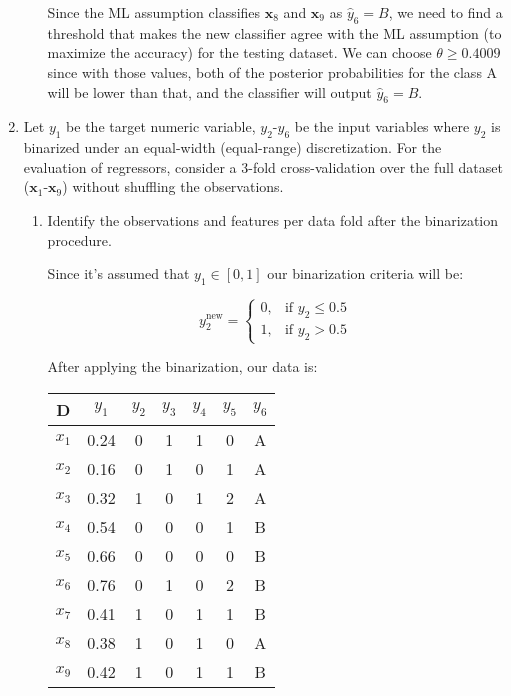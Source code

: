 \documentclass[12pt]{article}
\begin{document}
\begin{enumerate}[leftmargin=\labelsep]
\begin{enumerate}
            Since the ML assumption classifies $\mathbf{x}_8$ and $\mathbf{x}_9$ as $\hat{y}_6 = B$, we need to find a threshold that makes the new classifier agree with the ML assumption (to maximize the accuracy) for the testing dataset.
            We can choose $\theta \geq 0.4009$ since with those values, both of the posterior probabilities for the class A will be lower than that, and the classifier will output $\hat{y}_6 = B$.

    \end{enumerate}

    \item Let $y_1$ be the target numeric variable, $y_2$-$y_6$ be the input variables where $y_2$ is binarized under an
    equal-width (equal-range) discretization. For the evaluation of regressors, consider a 3-fold
    cross-validation over the full dataset ($\mathbf{x}_1$-$\mathbf{x}_9$) without shuffling the observations.

    \begin{enumerate}
        \item Identify the observations and features per data fold after the binarization procedure.
        
        Since it's assumed that $y_1 \in [0, 1]$ our binarization criteria will be:

        \[ 
            y_2^{\textrm{new}} = \left\{
            \begin{array}{ll}
                  0, & \textrm{if } y_2 \leq 0.5 \\
                  1, & \textrm{if } y_2 > 0.5
            \end{array} 
            \right. 
        \]

        After applying the binarization, our data is:

        \begin{center}
        \begin{tabular}{|c|c|c|c|c|c|c|}
        \hline
        D     & $y_1$ & $y_2$ & $y_3$ & $y_4$ & $y_5$ & $y_6$ \\
        \hline
        $x_1$ & 0.24  & 0     & 1     & 1     & 0     & A \\
        $x_2$ & 0.16  & 0     & 1     & 0     & 1     & A \\
        $x_3$ & 0.32  & 1     & 0     & 1     & 2     & A \\
        $x_4$ & 0.54  & 0     & 0     & 0     & 1     & B \\
        $x_5$ & 0.66  & 0     & 0     & 0     & 0     & B \\
        $x_6$ & 0.76  & 0     & 1     & 0     & 2     & B \\
        $x_7$ & 0.41  & 1     & 0     & 1     & 1     & B \\
        $x_8$ & 0.38  & 1     & 0     & 1     & 0     & A \\
        $x_9$ & 0.42  & 1     & 0     & 1     & 1     & B \\
        \hline
        \end{tabular}
        \end{center}


\end{enumerate}
\end{enumerate}
\end{document}
